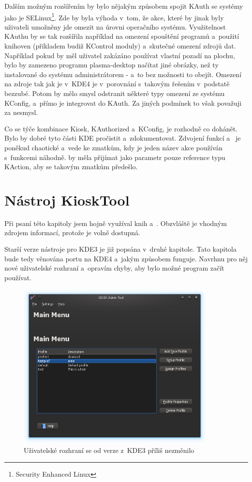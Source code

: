 Dalším možným rozšířením by bylo nějakým způsobem spojit KAuth se systémy jako je SELinux\footnote{Security Enhanced Linux}. Zde by byla výhoda v~tom, že akce, které by jinak byly uživateli umožněny jde omezit na úrovni operačního systému. Využitelnost KAuthu by se tak rozšířila například na omezení spouštění programů a~použití knihoven (příkladem budiž KControl moduly) a~skutečné omezení zdrojů dat. Například pokud by měl uživatel zakázáno používat vlastní pozadí na plochu, bylo by zamezeno programu plasma-desktop načítat jiné obrázky, než ty instalované do systému administrátorem - a~to bez možnosti to obejít. Omezení na zdroje tak jak je v~KDE4 je v~porovnání s~takovým řešením v~podstatě bezzubé. Potom by mělo smysl odstranit některé typy omezení ze systému KConfig, a~přímo je integrovat do KAuth. Za jiných podmínek to však považuji za nesmysl.

Co se týče kombinace Kiosk, KAuthorized a~KConfig, je rozhodně co dohánět. Bylo by dobré tyto části KDE pročistit a~zdokumentovat. Zdvojení funkcí  a~ je poněkud chaotické a~vede ke zmatkům, kdy je jeden název akce používán s~funkcemi náhodně.  by měla přijímat jako parametr pouze reference typu KAction, aby se takovým zmatkům předešlo.

\chapter{Nástroj KioskTool}
Při psaní této kapitoly jsem hojně využíval knih \cite{StarchQt4} a~\cite{Ezust}. Obzvláště \cite{Ezust} je vhodným zdrojem informací, protože je volně dostupná.

Starší verze nástroje pro KDE3 je již popsána v~druhé kapitole. Tato kapitola bude tedy věnována portu na KDE4 a~jakým způsobem funguje. Navrhnu pro něj nové uživatelské rozhraní a~opravím chyby, aby bylo možné program začít používat.

\begin{figure}[h]
    \centering
    \includegraphics[width=10cm]{obrazky/KioskToolKDE4/kiosktool_kde4.png}
    \caption{Uživatelské rozhraní se od verze z~KDE3 příliš nezměnilo}
    \label{fig:kt4_uvod}
\end{figure}

